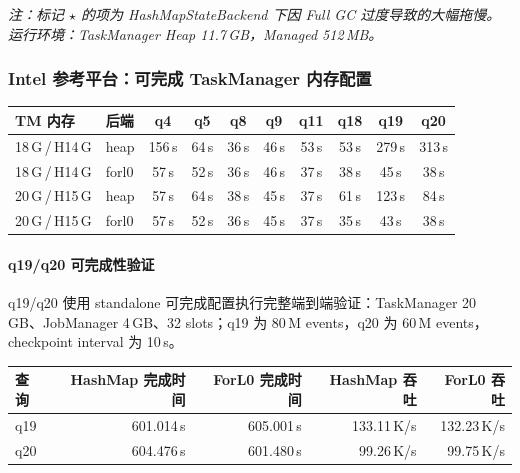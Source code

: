 \documentclass[a4paper,11pt]{article}
\begin{document}
\textit{注：标记 $\star$ 的项为 HashMapStateBackend 下因 Full GC 过度导致的大幅拖慢。运行环境：TaskManager Heap 11.7\,GB，Managed 512\,MB。}

\subsubsection{Intel 参考平台：可完成 TaskManager 内存配置}

\begin{table}[H]
\centering
\footnotesize
\setlength{\tabcolsep}{3.5pt}
\begin{tabular}{@{}ll cccccccc@{}}
\toprule
\textbf{TM 内存} & \textbf{后端} & \textbf{q4} & \textbf{q5} & \textbf{q8} & \textbf{q9} & \textbf{q11} & \textbf{q18} & \textbf{q19} & \textbf{q20} \\
\midrule
18\,G\,/\,H14\,G & heap  & 156\,s & 64\,s & 36\,s & 46\,s & 53\,s & 53\,s & 279\,s & 313\,s \\
18\,G\,/\,H14\,G & forl0 & 57\,s  & 52\,s & 36\,s & 46\,s & 37\,s & 38\,s & 45\,s  & 38\,s \\
\midrule
20\,G\,/\,H15\,G & heap  & 57\,s  & 64\,s & 38\,s & 45\,s & 37\,s & 61\,s & 123\,s & 84\,s \\
20\,G\,/\,H15\,G & forl0 & 57\,s  & 52\,s & 36\,s & 45\,s & 37\,s & 35\,s & 43\,s  & 38\,s \\
\bottomrule
\end{tabular}
\end{table}

\paragraph{q19/q20 可完成性验证}
q19/q20 使用 standalone 可完成配置执行完整端到端验证：TaskManager 20\,GB、JobManager 4\,GB、32 slots；q19 为 80\,M events，q20 为 60\,M events，checkpoint interval 为 10\,s。

\begin{center}
\small
\setlength{\tabcolsep}{4pt}
\begin{tabular}{@{}lrrrr@{}}
\toprule
\textbf{查询} & \textbf{HashMap 完成时间} & \textbf{ForL0 完成时间} & \textbf{HashMap 吞吐} & \textbf{ForL0 吞吐} \\
\midrule
q19 & 601.014\,s & 605.001\,s & 133.11\,K/s & 132.23\,K/s \\
q20 & 604.476\,s & 601.480\,s & 99.26\,K/s & 99.75\,K/s \\
\bottomrule
\end{tabular}
\end{center}
\end{document}
